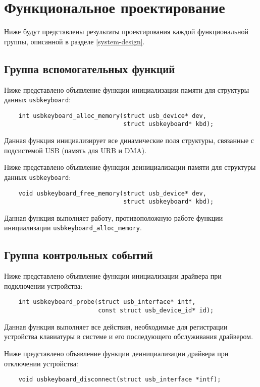 \section{Функциональное проектирование}

Ниже будут представлены результаты проектирования
каждой функциональной группы, описанной в разделе \ref{system-design}.

\subsection{Группа вспомогательных функций} \label{utility-group-design}

Ниже представлено объявление функции инициализации памяти
для структуры данных \texttt{usbkeyboard}:
\begin{verbatim}
    int usbkeyboard_alloc_memory(struct usb_device* dev, 
                                 struct usbkeyboard* kbd);
\end{verbatim}

Данная функция инициализирует все динамические поля структуры,
связанные с подсистемой USB (память для URB и DMA).

Ниже представлено объявление функции деинициализации памяти для
структуры данных \texttt{usbkeyboard}:
\begin{verbatim}
    void usbkeyboard_free_memory(struct usb_device* dev, 
                                 struct usbkeyboard* kbd);
\end{verbatim}

Данная функция выполняет работу, противоположную работе функции
инициализации \texttt{usbkeyboard\_alloc\_memory}.

\subsection{Группа контрольных событий}

Ниже представлено объявление функции инициализации драйвера
при подключении устройства:
\begin{verbatim}
    int usbkeyboard_probe(struct usb_interface* intf, 
                          const struct usb_device_id* id);
\end{verbatim}

Данная функция выполняет все действия, необходимые для регистрации
устройства клавиатуры в системе и его последующего обслуживания драйвером.

Ниже представлено объявление функции деинициализации драйвера
при отключении устройства:
\begin{verbatim}
    void usbkeyboard_disconnect(struct usb_interface *intf);
\end{verbatim}

